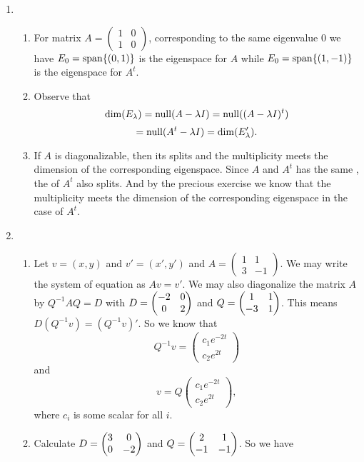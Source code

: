 \begin{enumerate}
\begin{enumerate}
\end{enumerate}
\item \begin{enumerate}
\item For matrix $A=\begin{pmatrix}1&0\\1&0\end{pmatrix}$, corresponding to the same eigenvalue $0$ we have $E_0=\sp\{(0,1)\}$ is the eigenspace for $A$ while $E_0=\sp\{(1,-1)\}$ is the eigenspace for $A^t$.
\item Observe that 
\[\dim(E_\lambda)=\nul(A-\lambda I)=\nul((A-\lambda I)^t)\]
\[=\nul(A^t-\lambda I)=\dim(E_\lambda').\]
\item If $A$ is diagonalizable, then its \charpoly{} splits and the multiplicity meets the dimension of the corresponding eigenspace. Since $A$ and $A^t$ has the same \charpoly{}, the \charpoly{} of $A^t$ also splits. And by the precious exercise we know that the multiplicity meets the dimension of the corresponding eigenspace in the case of $A^t$.
\end{enumerate}
\item \begin{enumerate}
\item Let $v=(x,y)$ and $v'=(x',y')$ and $A=\begin{pmatrix}1&1\\3&-1\end{pmatrix}$. We may write the system of equation as $Av=v'$. We may also diagonalize the matrix $A$ by $Q^{-1}AQ=D$ with $D=\begin{pmatrix}-2 & 0\cr 0 & 2\end{pmatrix}$ and $Q=\begin{pmatrix}1 & 1\cr -3 & 1\end{pmatrix}$. This means $D(Q^{-1}v)=(Q^{-1}v)'$. So we know that 
\[Q^{-1}v=\begin{pmatrix}c_1e^{-2t}\\c_2e^{2t}\end{pmatrix}\]
and
\[v=Q\begin{pmatrix}c_1e^{-2t}\\c_2e^{2t}\end{pmatrix},\]
where $c_i$ is some scalar for all $i$.
\item Calculate $D=\begin{pmatrix}3 & 0\cr 0 & -2\end{pmatrix}$ and $Q=\begin{pmatrix}2 & 1\cr -1 & -1\end{pmatrix}$. So we have 

\end{enumerate}
\end{enumerate}
